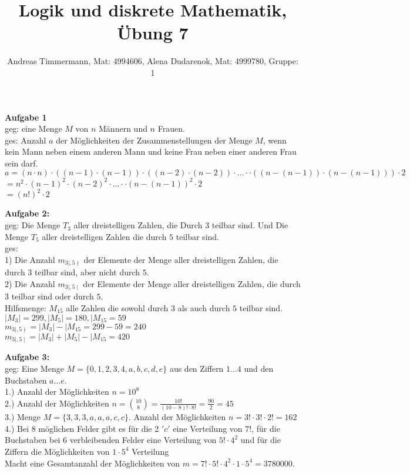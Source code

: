 \documentclass[a4paper]{scrartcl}
\title{Logik und diskrete Mathematik, Übung 7}
\author{Andreas Timmermann, Mat: 4994606, Alena Dudarenok, Mat: 4999780, Gruppe: 1}
\begin{document}
	\maketitle
	\begin{flushleft}
		\textbf{Aufgabe 1}\\
		geg: eine Menge $M$ von $n$ Männern und $n$ Frauen.\\
		ges: Anzahl $a$ der Möglichkeiten der Zusammenstellungen der Menge $M$, wenn kein Mann neben einem anderen Mann und keine Frau neben einer anderen Frau sein darf.\\[1em]
		
		$a = (n\cdot n)\cdot((n-1)\cdot (n-1))\cdot((n-2)\cdot (n-2))\cdot \dots\cdot\cdot((n-(n-1))\cdot (n-(n-1)))\cdot 2$\\
		$= n^2\cdot(n-1)^2\cdot(n-2)^2\cdot \dots\cdot\cdot(n-(n-1))^2\cdot 2$\\
		$=(n!)^2\cdot 2$\\
	\end{flushleft}
	\begin{flushleft}
		\textbf{Aufgabe 2:}\\
		geg: Die Menge $T_3$ aller dreistelligen Zahlen, die Durch $3$ teilbar sind. Und Die Menge $T_5$ aller dreistelligen Zahlen die durch $5$ teilbar sind.\\
		ges:\\
		1) Die Anzahl $m_{3\mid,5\nmid}$ der Elemente der Menge aller dreistelligen Zahlen, die durch $3$ teilbar sind, aber nicht durch $5$.\\
		2) Die Anzahl $m_{3\mid,5\mid}$ der Elemente der Menge aller dreistelligen Zahlen, die durch $3$ teilbar sind oder durch $5$.\\[1em]
		Hilfsmenge: $M_{15}$ alle Zahlen die sowohl durch $3$ als auch durch $5$ teilbar sind.\\
		$|M_3|=299, |M_5| = 180, |M_{15} = 59$\\
		$m_{3\mid,5\nmid}=|M_3|-|M_{15} = 299-59=240$\\
		$m_{3\mid,5\mid}=|M_3|+|M_5|-|M_{15}=420$\\[1em]
	\end{flushleft}
	\begin{flushleft}
		\textbf{Aufgabe 3:}\\	
		geg: Eine Menge $M=\{0,1,2,3,4,a,b,c,d,e\}$ aus den Ziffern $1\dots4$ und den Buchstaben $a\dots e$.\\[1em]
		1.) Anzahl der Möglichkeiten $n= 10^8$\\
		2.) Anzahl der Möglichkeiten $n= \binom{10}{8}=\frac{10!}{(10-8)!\cdot 8!}=\frac{90}{2}=45$\\
		3.) Menge $M=\{3,3,3,a,a,a,c,c\}$. Anzahl der Möglichkeiten $n= 3!\cdot 3!\cdot 2!= 162$\\
		4.) Bei $8$ möglichen Felder gibt es für die 2 $'c'$ eine Verteilung von $7!$, für die Buchstaben bei $6$ verbleibenden Felder eine Verteilung von $5!\cdot 4^2$ und für die Ziffern die Möglichkeiten von $1\cdot 5^4$ Verteilung\\
		Macht eine Gesamtanzahl der Möglichkeiten von $m=7!\cdot 5!\cdot 4^2\cdot 1\cdot 5^4=3780000$.\\[1em]
	\end{flushleft}
\end{document}
